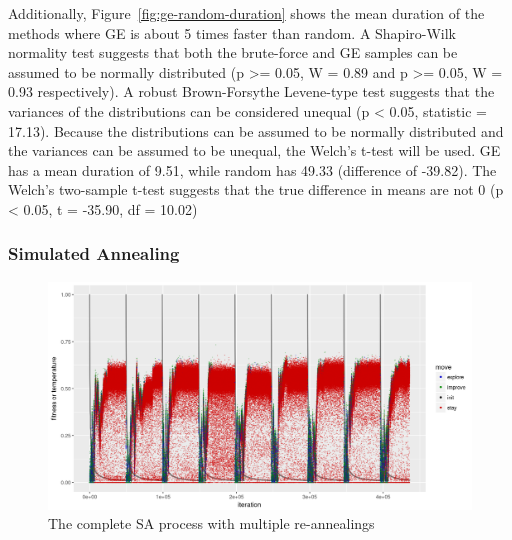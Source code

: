 Additionally, Figure~\ref{fig:ge-random-duration} shows the mean duration of the methods where \gls{GE} is about 5 times faster than random.
A Shapiro-Wilk normality test suggests that both the brute-force and \gls{GE} samples can be assumed to be normally distributed (p >= 0.05, W = 0.89 and p >= 0.05, W = 0.93 respectively).
A robust Brown-Forsythe Levene-type test suggests that the variances of the distributions can be considered unequal (p < 0.05, statistic = 17.13).
Because the distributions can be assumed to be normally distributed and the variances can be assumed to be unequal, the Welch's t-test will be used.
\gls{GE} has a mean duration of 9.51, while random has 49.33 (difference of -39.82).
The Welch's two-sample t-test suggests that the true difference in means are not 0 (p < 0.05, t = -35.90, df = 10.02)

\subsubsection{Simulated Annealing}
\begin{figure}
    \includegraphics[width=\textwidth]{figures/sa-progress}
    \caption[The complete SA process with multiple re-annealings]{The complete \gls{SA} process with multiple re-annealings}
    \label{fig:sa-progress}
\end{figure}

